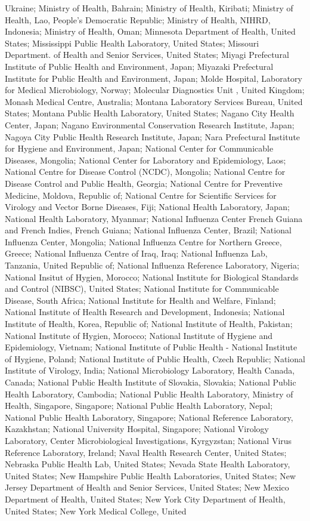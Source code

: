 \begin{appendixbox}
Ukraine; Ministry of Health, Bahrain; Ministry of Health, Kiribati; Ministry of Health, Lao, People's Democratic Republic; Ministry of Health, NIHRD, Indonesia; Ministry of Health, Oman; Minnesota Department of Health, United States; Mississippi Public Health Laboratory, United States; Missouri Department. of Health and Senior Services, United States; Miyagi Prefectural Institute of Public Health and Environment, Japan; Miyazaki Prefectural Institute for Public Health and Environment, Japan; Molde Hospital, Laboratory for Medical Microbiology, Norway; Molecular Diagnostics Unit , United Kingdom; Monash Medical Centre, Australia; Montana Laboratory Services Bureau, United States; Montana Public Health Laboratory, United States; Nagano City Health Center, Japan; Nagano Environmental Conservation Research Institute, Japan; Nagoya City Public Health Research Institute, Japan; Nara Prefectural Institute for Hygiene and Environment, Japan; National Center for Communicable Diseases, Mongolia; National Center for Laboratory and Epidemiology, Laos; National Centre for Disease Control (NCDC), Mongolia; National Centre for Disease Control and Public Health, Georgia; National Centre for Preventive Medicine, Moldova, Republic of; National Centre for Scientific Services for Virology and Vector Borne Diseases, Fiji; National Health Laboratory, Japan; National Health Laboratory, Myanmar; National Influenza Center French Guiana and French Indies, French Guiana; National Influenza Center, Brazil; National Influenza Center, Mongolia; National Influenza Centre for Northern Greece, Greece; National Influenza Centre of Iraq, Iraq; National Influenza Lab, Tanzania, United Republic of; National Influenza Reference Laboratory, Nigeria; National Insitut of Hygien, Morocco; National Institute for Biological Standards and Control (NIBSC), United States; National Institute for Communicable Disease, South Africa; National Institute for Health and Welfare, Finland; National Institute of Health Research and Development, Indonesia; National Institute of Health, Korea, Republic of; National Institute of Health, Pakistan; National Institute of Hygien, Morocco; National Institute of Hygiene and Epidemiology, Vietnam; National Institute of Public Health - National Institute of Hygiene, Poland; National Institute of Public Health, Czech Republic; National Institute of Virology, India; National Microbiology Laboratory, Health Canada, Canada; National Public Health Institute of Slovakia, Slovakia; National Public Health Laboratory, Cambodia; National Public Health Laboratory, Ministry of Health, Singapore, Singapore; National Public Health Laboratory, Nepal; National Public Health Laboratory, Singapore; National Reference Laboratory, Kazakhstan; National University Hospital, Singapore; National Virology Laboratory, Center Microbiological Investigations, Kyrgyzstan; National Virus Reference Laboratory, Ireland; Naval Health Research Center, United States; Nebraska Public Health Lab, United States; Nevada State Health Laboratory, United States; New Hampshire Public Health Laboratories, United States; New Jersey Department of Health and Senior Services, United States; New Mexico Department of Health, United States; New York City Department of Health, United States; New York Medical College, United 
\end{appendixbox}
